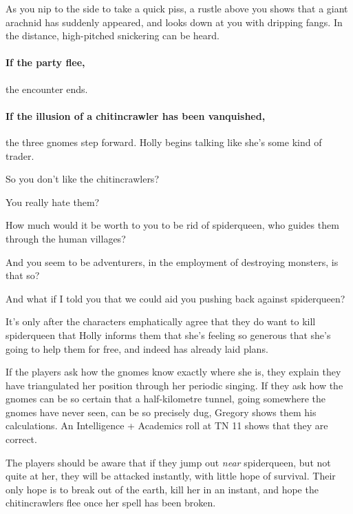 \begin{multicols}{2}
\begin{boxtext}

  As you nip to the side to take a quick piss, a rustle above you shows that a giant arachnid has suddenly appeared, and looks down at you with dripping fangs.
  In the distance, high-pitched snickering can be heard.

\end{boxtext}

\paragraph{If the party flee,}
the encounter ends.

\paragraph{If the illusion of a chitincrawler has been vanquished,}
the three gnomes step forward.
Holly begins talking like she's some kind of trader.

\begin{speechtext}

  So you don't like the chitincrawlers?

  You really hate them?

  How much would it be worth to you to be rid of \gls{spiderqueen}, who guides them through the human villages?

  And you seem to be adventurers, in the employment of destroying monsters, is that so?

  And what if I told you that we could aid you pushing back against \gls{spiderqueen}?

\end{speechtext}

It's only after the characters emphatically agree that they do want to kill \gls{spiderqueen} that Holly informs them that she's feeling so generous that she's going to help them for free, and indeed has already laid plans.

If the players ask how the gnomes know exactly where she is, they explain they have triangulated her position through her periodic singing.
If they ask how the gnomes can be so certain that a half-kilometre tunnel, going somewhere the gnomes have never seen, can be so precisely dug, Gregory shows them his calculations.
An Intelligence + Academics roll at TN 11 shows that they are correct.

The players should be aware that if they jump out \emph{near} \gls{spiderqueen}, but not quite at her, they will be attacked instantly, with little hope of survival.
Their only hope is to break out of the earth, kill her in an instant, and hope the chitincrawlers flee once her spell has been broken.


\end{multicols}
